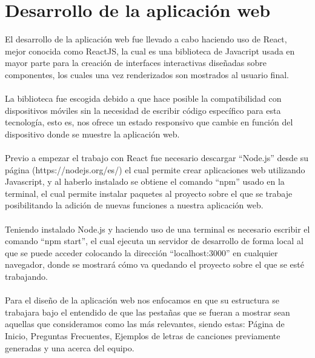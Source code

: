 \documentclass[12pt, a4paper, titlepage]{article}
\begin{document}
	\section{Desarrollo de la aplicación web}
	El desarrollo de la aplicación web fue llevado a cabo haciendo uso de React, mejor conocida como ReactJS, la cual es una biblioteca de Javacript usada en mayor parte para la creación de interfaces interactivas diseñadas sobre componentes, los cuales una vez renderizados son mostrados al usuario final.\\\\
	La biblioteca fue escogida debido a que hace posible la compatibilidad con dispositivos móviles sin la necesidad de escribir código específico para esta tecnología, esto es, nos ofrece un estado responsivo que cambie en función del dispositivo donde se muestre la aplicación web.\\\\
	Previo a empezar el trabajo con React fue necesario descargar “Node.js” desde su página (https://nodejs.org/es/) el cual permite crear aplicaciones web utilizando Javascript, y al haberlo instalado se obtiene el comando “npm” usado en la terminal, el cual permite instalar paquetes al proyecto sobre el que se trabaje posibilitando la adición de nuevas funciones a nuestra aplicación web.\\\\
	Teniendo instalado Node.js y haciendo uso de una terminal es necesario escribir el comando “npm start”, el cual ejecuta un servidor de desarrollo de forma local al que se puede acceder colocando la dirección “localhost:3000” en cualquier navegador, donde se mostrará cómo va quedando el proyecto sobre el que se esté trabajando.\\\\
	Para el diseño de la aplicación web nos enfocamos en que su estructura se trabajara bajo el entendido de que las pestañas que se fueran a mostrar sean aquellas que consideramos como las más relevantes, siendo estas: Página de Inicio, Preguntas Frecuentes, Ejemplos de letras de canciones previamente generadas y una acerca del equipo.\\\\
\end{document}
